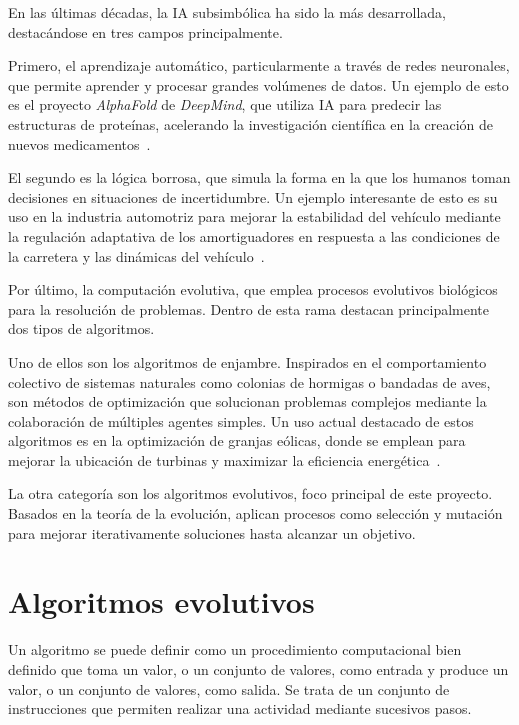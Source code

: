 En las últimas décadas, la IA subsimbólica ha sido la más desarrollada, destacándose en tres campos principalmente.

Primero, el aprendizaje automático, particularmente a través de redes neuronales, que permite aprender y procesar grandes volúmenes de datos. Un ejemplo de esto es el proyecto \textit{AlphaFold} de \textit{DeepMind}, que utiliza IA para predecir las estructuras de proteínas, acelerando la investigación científica en la creación de nuevos medicamentos~\cite{alphafold2024}.

El segundo es la lógica borrosa, que simula la forma en la que los humanos toman decisiones en situaciones de incertidumbre. Un ejemplo interesante de esto es su uso en la industria automotriz para mejorar la estabilidad del vehículo mediante la regulación adaptativa de los amortiguadores en respuesta a las condiciones de la carretera y las dinámicas del vehículo~\cite{ivanov2015}.

Por último, la computación evolutiva, que emplea procesos evolutivos biológicos para la resolución de problemas. Dentro de esta rama destacan principalmente dos tipos de algoritmos.

Uno de ellos son los algoritmos de enjambre. Inspirados en el comportamiento colectivo de sistemas naturales como colonias de hormigas o bandadas de aves, son métodos de optimización que solucionan problemas complejos mediante la colaboración de múltiples agentes simples. Un uso actual destacado de estos algoritmos es en la optimización de granjas eólicas, donde se emplean para mejorar la ubicación de turbinas y maximizar la eficiencia energética~\cite{dong2023}.

La otra categoría son los algoritmos evolutivos, foco principal de este proyecto. Basados en la teoría de la evolución, aplican procesos como selección y mutación para mejorar iterativamente soluciones hasta alcanzar un objetivo.

\section{Algoritmos evolutivos}

Un algoritmo se puede definir como un procedimiento computacional bien definido que toma un valor, o un conjunto de valores, como entrada y produce un valor, o un conjunto de valores, como salida. Se trata de un conjunto de instrucciones que permiten realizar una actividad mediante sucesivos pasos.


